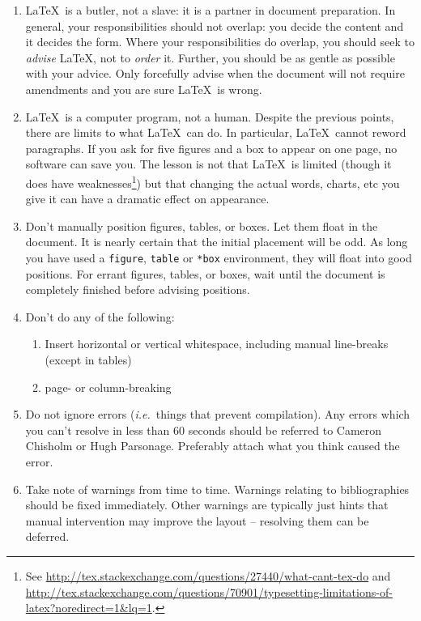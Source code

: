 \documentclass[a4paper,11pt]{scrartcl}\usepackage[]{graphicx}\usepackage[]{color}
\begin{document}
\begin{enumerate}
  \item \LaTeX\ is a butler, not a slave: it is a partner in document preparation. In general, your responsibilities should not overlap: you decide the content and it decides the form. Where your responsibilities do overlap, you should seek to \emph{advise} \LaTeX, not to \emph{order} it. Further, you should be as gentle as possible with your advice. Only forcefully advise when the document will not require amendments and you are sure \LaTeX\ is wrong. 
  \item \LaTeX\ is a computer program, not a human. Despite the previous points, there are limits to what \LaTeX\ can do. In particular, \LaTeX\ cannot reword paragraphs. If you ask for five figures and a box to appear on one page, no software can save you. The lesson is not that \LaTeX\ is limited (though it does have weaknesses\footnote{See \url{http://tex.stackexchange.com/questions/27440/what-cant-tex-do} and \url{http://tex.stackexchange.com/questions/70901/typesetting-limitations-of-latex?noredirect=1&lq=1}.}) but that changing the actual words, charts, etc you give it can have a dramatic effect on appearance. 
  \item Don't manually position figures, tables, or boxes. Let them float in the document. It is nearly certain that the initial placement will be odd. As long you have used a \verb=figure=, \verb=table= or \verb=*box= environment, they will float into good positions. For errant figures, tables, or boxes, wait until the document is completely finished before advising positions.
  \item Don't do any of the following:
  \begin{enumerate}
   \item Insert horizontal or vertical whitespace, including manual line-breaks (except in tables)
   \item page- or column-breaking
  \end{enumerate}
  \item Do not ignore errors (\emph{i.e.}~things that prevent compilation). Any errors which you can't resolve in less than 60 seconds should be referred to Cameron Chisholm or Hugh Parsonage. Preferably attach what you think caused the error.
  \item Take note of warnings from time to time. Warnings relating to bibliographies should be fixed immediately. Other warnings are typically just hints that manual intervention may improve the layout -- resolving them can be deferred.


\end{enumerate}
\end{document}
